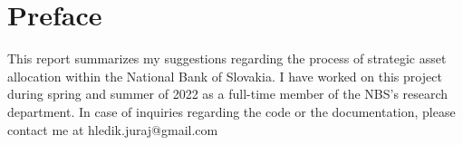 \chapter*{Preface}

This report summarizes my suggestions regarding the process of strategic asset allocation within the National Bank of Slovakia. I have worked on this project during spring and summer of 2022 as a full-time member of the NBS's research department. In case of inquiries regarding the code or the documentation, please contact me at hledik.juraj@gmail.com
\begin{flushright}
{\makeatletter\itshape
    \@author \\
\makeatother}
\end{flushright}
